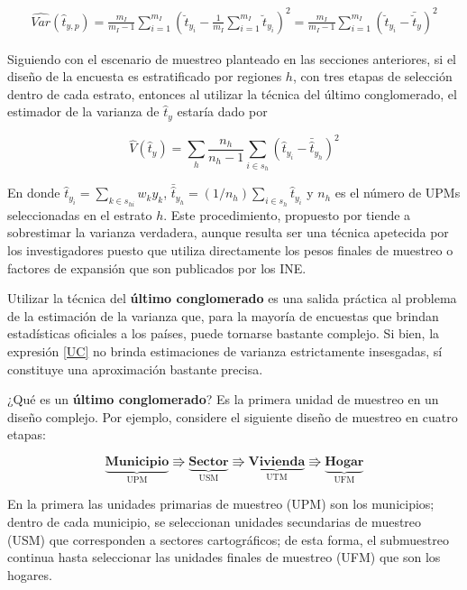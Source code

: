 \documentclass[
  10pt,
  spanish,
]{book}
\begin{document}
\begin{align}
\label{UC}
\widehat{Var}(\hat{t}_{y,p})
=\frac{m_I}{m_I-1}\sum_{i=1}^{m_I}\left( \breve{t}_{y_i} -\frac{1}{m_I}\sum_{i=1}^{m_I}\breve{t}_{y_i} \right)^2 
=\frac{m_I}{m_I-1}\sum_{i=1}^{m_I}\left( \breve{t}_{y_i} - \bar{\breve{t}}_{y} \right)^2
\end{align}

Siguiendo con el escenario de muestreo planteado en las secciones anteriores, si el diseño de la encuesta es estratificado por regiones \(h\), con tres etapas de selección dentro de cada estrato, entonces al utilizar la técnica del último conglomerado, el estimador de la varianza de \(\hat{t}_{y}\) estaría dado por

\[
\hat{V}(\hat{t}_{y}) = 
\sum_h\frac{n_h}{n_h-1}\sum_{i\in s_h}\left(\hat{t}_{y_i}-\bar{\hat{t}}_{y_h}\right)^2
\]

En donde \(\hat{t}_{y_i} = \sum_{k \in s_{hi}} w_k y_k\), \(\bar{\hat{t}}_{y_h}=(1/n_h)\sum_{i \in s_h}\hat{t}_{y_i}\) y \(n_h\) es el número de UPMs seleccionadas en el estrato \(h\). Este procedimiento, propuesto por \citet{hansen1953sample} tiende a sobrestimar la varianza verdadera, aunque resulta ser una técnica apetecida por los investigadores puesto que utiliza directamente los pesos finales de muestreo o factores de expansión que son publicados por los INE.

Utilizar la técnica del \textbf{último conglomerado} es una salida práctica al problema de la estimación de la varianza que, para la mayoría de encuestas que brindan estadísticas oficiales a los países, puede tornarse bastante complejo. Si bien, la expresión \eqref{UC} no brinda estimaciones de varianza estrictamente insesgadas, sí constituye una aproximación bastante precisa.

¿Qué es un \textbf{último conglomerado}? Es la primera unidad de muestreo en un diseño complejo. Por ejemplo, considere el siguiente diseño de muestreo en cuatro etapas:

\begin{equation*}
\underbrace{\textbf{Municipio}}_{\text{UPM}} \Rrightarrow
\underbrace{\textbf{Sector}}_{\text{USM}} \Rrightarrow
\underbrace{\textbf{Vivienda}}_{\text{UTM}} \Rrightarrow
\underbrace{\textbf{Hogar}}_{\text{UFM}}
\end{equation*}

En la primera las unidades primarias de muestreo (UPM) son los municipios; dentro de cada municipio, se seleccionan unidades secundarias de muestreo (USM) que corresponden a sectores cartográficos; de esta forma, el submuestreo continua hasta seleccionar las unidades finales de muestreo (UFM) que son los hogares.
\end{document}
